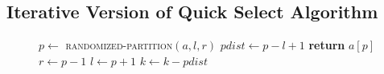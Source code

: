 \subsection*{Iterative Version of Quick Select Algorithm}
\begin{figure}[H]
\begin{center}
\end{center}
\begin{algorithmic}[1]
        \State $p \gets$ \textsc{randomized-partition}$(a, l, r)$
        \State $pdist \gets p - l + 1$
            \State \textbf{return} $a[p]$
            \State $r \gets p - 1$
            \State $l \gets p + 1$
            \State $k \gets k - pdist$  
        \EndIf
    \EndWhile
\EndFunction 
\end{algorithmic}
\end{figure}




